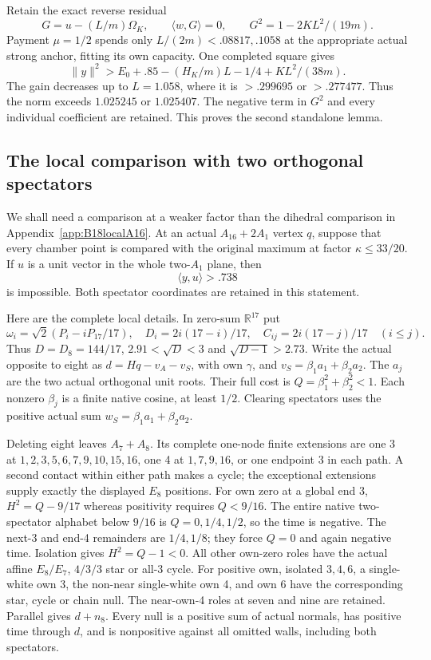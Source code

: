 \documentclass[11pt]{article}
\theoremstyle{definition}
\theoremstyle{remark}
\newcommand{\ip}[2]{\langle #1,#2\rangle}
\newcommand{\norm}[1]{\lVert #1\rVert}
\begin{document}
Retain the exact reverse residual
\[
 G=u-(L/m)\Omega_K,\qquad
 \ip wG=0,\qquad G^2=1-2KL^2/(19m).
\]
Payment \(\mu=1/2\) spends only \(L/(2m)<.08817,.1058\)
at the appropriate actual strong anchor, fitting its own capacity.
One completed square gives
\[
 \norm y^2>E_0+.85-(H_K/m)L-1/4+KL^2/(38m).
\]
The gain decreases up to \(L=1.058\), where it is
\(>.299695\) or \(>.277477\).
Thus the norm exceeds \(1.025245\) or \(1.025407\).
The negative term in \(G^2\) and every individual coefficient
are retained. This proves the second standalone lemma.

\subsection{The local comparison with two orthogonal spectators}
\label{app:D18localtwoA1}

We shall need a comparison at a weaker factor than the dihedral
comparison in Appendix~\ref{app:B18localA16}.  At an actual
\(A_{16}+2A_1\) vertex \(q\), suppose that every chamber point is
compared with the original maximum at factor
\(\kappa\le33/20\).  If \(u\) is a unit vector in the whole
two-\(A_1\) plane, then
\[
                     \ip yu>.738
\tag{D2A1}\label{eq:D2A1}
\]
is impossible.  Both spectator coordinates are retained in this
statement.

Here are the complete local details.  In zero-sum \(\mathbb R^{17}\)
put
\[
 \omega_i=\sqrt2(P_i-iP_{17}/17),\quad
 D_i=2i(17-i)/17,\quad C_{ij}=2i(17-j)/17\quad(i\le j).
\]
Thus \(D=D_8=144/17\), \(2.91<\sqrt D<3\) and
\(\sqrt{D-1}>2.73\).
Write the actual opposite to eight as
\(d=Hq-v_A-v_S\), with own \(\gamma\), and
\(v_S=\beta_1a_1+\beta_2a_2\).
The \(a_j\) are the two actual orthogonal unit roots.
Their full cost is \(Q=\beta_1^2+\beta_2^2<1\).
Each nonzero \(\beta_j\) is a finite native cosine, at least \(1/2\).
Clearing spectators uses the positive actual sum
\(w_S=\beta_1a_1+\beta_2a_2\).

Deleting eight leaves \(A_7+A_8\).
Its complete one-node finite extensions are one 3 at
\(1,\allowbreak 2,\allowbreak 3,\allowbreak 5,\allowbreak 6,\allowbreak 7,\allowbreak 9,\allowbreak 10,\allowbreak 15,\allowbreak 16\), one 4 at
\(1,\allowbreak 7,\allowbreak 9,\allowbreak 16\), or one endpoint 3 in each path.
A second contact within either path makes a cycle; the exceptional
extensions supply exactly the displayed \(E_8\) positions.
For own zero at a global end 3,
\(H^2=Q-9/17\) whereas positivity requires \(Q<9/16\).
The entire native two-spectator alphabet below \(9/16\) is
\(Q=0,\allowbreak 1/4,\allowbreak 1/2\), so the time is negative.
The next-3 and end-4 remainders are \(1/4,\allowbreak 1/8\);
they force \(Q=0\) and again negative time.
Isolation gives \(H^2=Q-1<0\).
All other own-zero roles have the actual affine \(E_8/E_7\),
\(4/3/3\) star or all-3 cycle.
For positive own, isolated \(3,\allowbreak 4,\allowbreak 6\), a single-white own 3,
the non-near single-white own 4, and own 6 have the corresponding
star, cycle or chain null.  The near-own-4 roles at seven and nine
are retained.  Parallel gives \(d+n_8\).
Every null is a positive sum of actual normals, has positive time
through \(d\), and is nonpositive against all omitted walls,
including both spectators.
\end{document}
